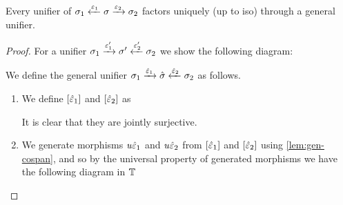 \begin{lemma}\label{lem:general-unifier-prop}
    Every unifier of $\sigma_1 \xleftarrow{\varepsilon_1} \sigma \xrightarrow{\varepsilon_2} \sigma_2$ factors uniquely (up to iso) through a general unifier.
\end{lemma}
\begin{proof}
    For a unifier $\sigma_1 \xrightarrow{\varepsilon_1'} \sigma' \xleftarrow{\varepsilon_2'} \sigma_2$ we show the following diagram:
    \begin{center}
    \end{center}
    We define the general unifier $\sigma_1 \xrightarrow{\hat{\varepsilon}_1} \hat\sigma \xleftarrow{\hat{\varepsilon}_2} \sigma_2$ as follows.
    \begin{enumerate}
        \item We define $[\hat{\varepsilon}_1]$ and $[\hat{\varepsilon}_2]$ as
              \begin{center}
              \end{center}
              It is clear that they are jointly surjective.
        \item We generate morphisms $\mathit{u}\hat{\varepsilon}_1$ and $\mathit{u}\hat{\varepsilon}_2$ from $[\hat{\varepsilon}_1]$ and $[\hat{\varepsilon}_2]$ using \cref{lem:gen-cospan},
              and so by the universal property of generated morphisms we have the following diagram in $\mathbb{T}$
              \begin{center}
              \begin{tikzcd}

\end{tikzcd}
\end{center}
\end{enumerate}
\end{proof}
